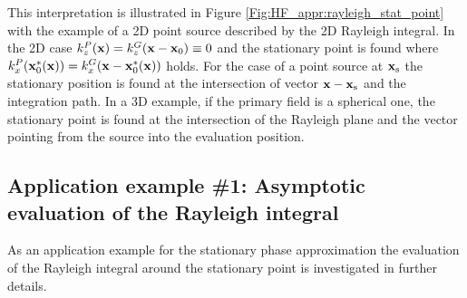 This interpretation is illustrated in Figure \ref{Fig:HF_appr:rayleigh_stat_point} with the example of a 2D point source described by the 2D Rayleigh integral.
In the 2D case $k_z^P(\mathbf{x}) = k_z^G(\mathbf{x}-\mathbf{x}_0) \equiv 0$ and the stationary point is found where $k_x^P(\mathbf{x}_0^*(\mathbf{x})) = k_x^G(\mathbf{x}-\mathbf{x}_0^*(\mathbf{x}))$ holds.
For the case of a point source at $\mathbf{x}_{\mathrm{s}}$ the stationary position is found at the intersection of vector $\mathbf{x}-\mathbf{x}_{\mathrm{s}}$ and the integration path.
In a 3D example, if the primary field is a spherical one, the stationary point is found at the intersection of the Rayleigh plane and the vector pointing from the source into the evaluation position. 

\subsection*{Application example \#1: Asymptotic evaluation of the Rayleigh integral}
\label{Sec:HF:RayleighSPA}
As an application example for the stationary phase approximation the evaluation of the Rayleigh integral around the stationary point is investigated in further details.

